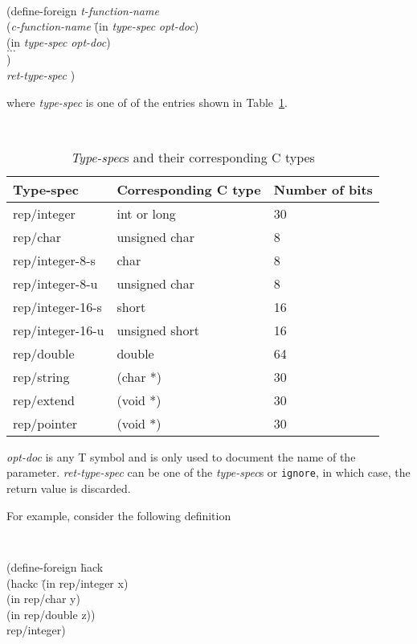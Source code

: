 \horizline
{\tt
\begin{tabbing}
(define-foreign \= {\em t-function-name}\\
	\> ({\em c-function-name\/} \= (in {\em type-spec} {\em opt-doc\/})\\
		\>\> (in {\em type-spec} {\em opt-doc\/})\\
		\>\> $\dots$\\
	\> )\\
	\> {\em ret-type-spec} )
\end{tabbing}
}
\horizline

where {\em type-spec\/} is one of of the entries shown in
Table~\ref{table-type}.

\begin{table}
\tt
\begin{tabular}{lll}
{\rm Type-spec}	& {\rm Corresponding C type}	& {\rm Number of bits}\\
\hline
rep/integer		& int {\rm or} long	& 30\\
rep/char		& unsigned char		& 8\\
rep/integer-8-s		& char			& 8\\
rep/integer-8-u		& unsigned char		& 8\\
rep/integer-16-s	& short			& 16\\
rep/integer-16-u	& unsigned short	& 16\\
rep/double		& double		& 64\\
rep/string		& (char *)		& 30\\
rep/extend		& (void *)		& 30\\
rep/pointer		& (void *)		& 30
\end{tabular}
\caption{{\em Type-spec\/}s and their corresponding C types}
\label{table-type}
\end{table}

{\em opt-doc\/} is any T symbol and is only used to document the name
of the parameter.
{\em ret-type-spec\/} can be one of the {\em type-spec\/}s or
{\tt ignore}, in which case, the return value is discarded.

For example, consider the following definition

\horizline
{\tt
\begin{tabbing}
(define-foreign \= hack\+ \\
	(hackc \= (in rep/integer x)\+ \\
		(in rep/char y)\\
		(in rep/double z))\- \\
	rep/integer)
\end{tabbing}
}
\horizline


